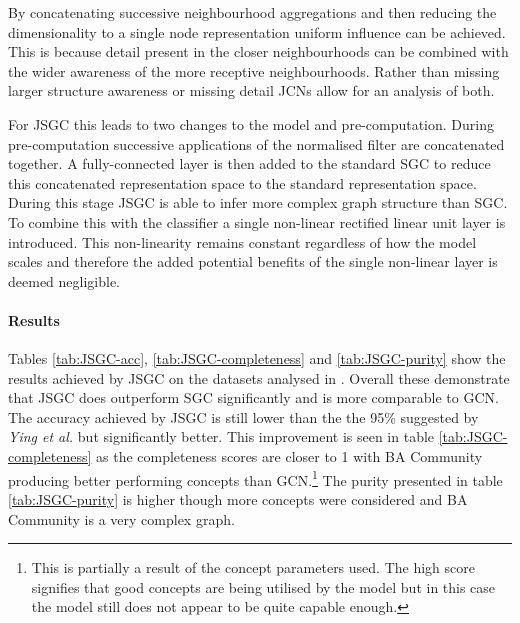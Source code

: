 By concatenating successive neighbourhood aggregations and then reducing the dimensionality to a single node representation uniform influence can be achieved.
This is because detail present in the closer neighbourhoods can be combined with the wider awareness of the more receptive neighbourhoods.
Rather than missing larger structure awareness or missing detail JCNs allow for an analysis of both.

For JSGC this leads to two changes to the model and pre-computation.
During pre-computation successive applications of the normalised filter are concatenated together.
A fully-connected layer is then added to the standard SGC to reduce this concatenated representation space to the standard representation space.
During this stage JSGC is able to infer more complex graph structure than SGC.
To combine this with the classifier a single non-linear rectified linear unit layer is introduced.
This non-linearity remains constant regardless of how the model scales and therefore the added potential benefits of the single non-linear layer is deemed negligible.

\paragraph{Results}





Tables \ref{tab:JSGC-acc}, \ref{tab:JSGC-completeness} and \ref{tab:JSGC-purity} show the results achieved by JSGC on the datasets analysed in .
Overall these demonstrate that JSGC does outperform SGC significantly and is more comparable to GCN.
The accuracy achieved by JSGC is still lower than the the 95\% suggested by \textit{Ying et al.}\cite{ying2019gnnexplainer} but significantly better.
This improvement is seen in table \ref{tab:JSGC-completeness} as the completeness scores are closer to 1 with BA Community producing better performing concepts than GCN.\footnote{This is partially a result of the concept parameters used. The high score signifies that good concepts are being utilised by the model but in this case the model still does not appear to be quite capable enough.}
The purity presented in table \ref{tab:JSGC-purity} is higher though more concepts were considered and BA Community is a very complex graph.


